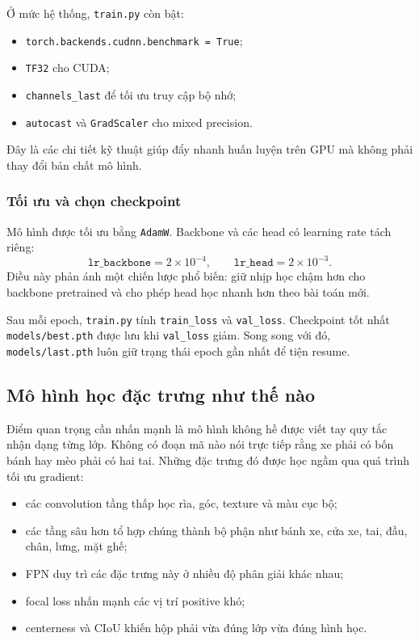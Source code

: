 \documentclass[12pt,a4paper]{article}
\begin{document}
Ở mức hệ thống, \texttt{train.py} còn bật:
\begin{itemize}
    \item \texttt{torch.backends.cudnn.benchmark = True};
    \item \texttt{TF32} cho CUDA;
    \item \texttt{channels\_last} để tối ưu truy cập bộ nhớ;
    \item \texttt{autocast} và \texttt{GradScaler} cho mixed precision.
\end{itemize}
Đây là các chi tiết kỹ thuật giúp đẩy nhanh huấn luyện trên GPU mà không phải thay đổi bản chất mô hình.

\subsubsection{Tối ưu và chọn checkpoint}
Mô hình được tối ưu bằng \texttt{AdamW}. Backbone và các head có learning rate tách riêng:
\[
\texttt{lr\_backbone} = 2\times 10^{-4}, \qquad \texttt{lr\_head} = 2\times 10^{-3}.
\]
Điều này phản ánh một chiến lược phổ biến: giữ nhịp học chậm hơn cho backbone pretrained và cho phép head học nhanh hơn theo bài toán mới.

Sau mỗi epoch, \texttt{train.py} tính \texttt{train\_loss} và \texttt{val\_loss}. Checkpoint tốt nhất \texttt{models/best.pth} được lưu khi \texttt{val\_loss} giảm. Song song với đó, \texttt{models/last.pth} luôn giữ trạng thái epoch gần nhất để tiện resume.

\subsection{Mô hình học đặc trưng như thế nào}
Điểm quan trọng cần nhấn mạnh là mô hình không hề được viết tay quy tắc nhận dạng từng lớp. Không có đoạn mã nào nói trực tiếp rằng xe phải có bốn bánh hay mèo phải có hai tai. Những đặc trưng đó được học ngầm qua quá trình tối ưu gradient:
\begin{itemize}
    \item các convolution tầng thấp học rìa, góc, texture và màu cục bộ;
    \item các tầng sâu hơn tổ hợp chúng thành bộ phận như bánh xe, cửa xe, tai, đầu, chân, lưng, mặt ghế;
    \item FPN duy trì các đặc trưng này ở nhiều độ phân giải khác nhau;
    \item focal loss nhấn mạnh các vị trí positive khó;
    \item centerness và CIoU khiến hộp phải vừa đúng lớp vừa đúng hình học.
\end{itemize}
\end{document}

